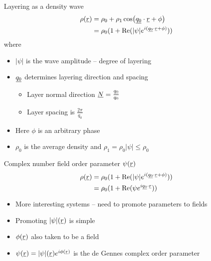 \documentclass[10pt,mathserif]{beamer}
\newcommand{\suf}[2]{\stackunder[0.5pt]{\stackunder[1pt]{\ensuremath{#1}}{\rule{\widthof{\ensuremath{#2}}*\real{0.9}}{.1ex}}}{}}
\newcommand{\su}[1]{\suf{#1}{#1}}
\newcommand{\ssu}[1]{\scriptsize\su{#1}\normalsize}
\newcommand{\NN}{\ensuremath{\su{N}}}
\newcommand{\extra}[1]{\color{gray} #1 \normalcolor}
\begin{document}
\begin{frame}[fragile]{Layering as a density wave}
    \newrefsection
    \vspace{-1em}
    \begin{align*}
        \rho(\su{r}) &= \rho_0 + \rho_1\cos(\su{q_0}\cdot\su{r} + \phi) \\
        &= \rho_0 (1 + \Re(|\psi| e^{i(\ssu{q_0} \cdot \ssu{r} + \phi)}))
    \end{align*}
    where
    \begin{itemize}
        \item $|\psi|$ is the wave amplitude -- degree of layering
        \item $\su{q_0}$ determines layering direction and spacing
        \begin{itemize}
            \item Layer normal direction $\NN=\frac{\ssu{q_0}}{q_0}$
            \item Layer spacing is $\frac{2\pi}{q_0}$
        \end{itemize}
        \item Here $\phi$ is an arbitrary phase
        \extra{\item $\rho_0$ is the average density and $\rho_1=\rho_0|\psi| \leq \rho_0$}
    \end{itemize}
\end{frame}

\begin{frame}[fragile]{Complex number field order parameter $\psi(\su{r})$}
    \newrefsection
    \vspace{-\fill}
    \begin{align*}
        \rho(\su{r}) &= \rho_0 (1 + \Re(|\psi| e^{i(\ssu{q_0} \cdot \ssu{r} + \phi)})) \\
        &= \rho_0 (1 + \Re(\psi e^{i\ssu{q_0} \cdot \ssu{r}}))
    \end{align*}
    \vspace{\fill}
    \begin{itemize}
        \item More interesting systems -- need to promote parameters to fields
        \item Promoting $|\psi|(\su{r})$ is simple
        \item $\phi(\su{r})$ also taken to be a field
        \item $\psi(\su{r}) = |\psi|(\su{r})e^{i\phi(\ssu{r})}$ is the de Gennes complex order parameter
    \end{itemize}
    \vspace{\fill}
    \printbibliography[heading=none]
    \vspace{-\fill}
\end{frame}
\end{document}
